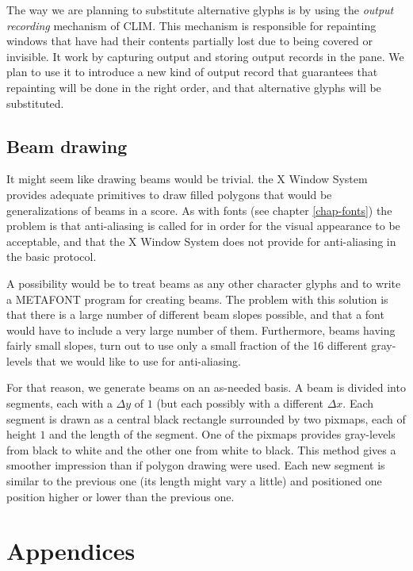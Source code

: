 \documentclass[11pt]{book}
\def\clim{CLIM}
\def\xwin{the X Window System}
\def\metafont{METAFONT}
\begin{document}
The way we are planning to substitute alternative glyphs is by using
the \emph{output recording} mechanism of {\clim}.  This mechanism is
responsible for repainting windows that have had their contents
partially lost due to being covered or invisible.  It work by
capturing output and storing output records in the pane.  We plan to
use it to introduce a new kind of output record that guarantees that
repainting  will be done in the right order, and that alternative
glyphs will be substituted. 

\chapter{Beam drawing}

It might seem like drawing beams would be trivial.  {\xwin} provides
adequate primitives to draw filled polygons that would be
generalizations of beams in a score.  As with fonts (see chapter
\ref{chap-fonts}) the problem is that anti-aliasing is called for in
order for the visual appearance to be acceptable, and that {\xwin}
does not provide for anti-aliasing in the basic protocol.  

A possibility would be to treat beams as any other character glyphs
and to write a {\metafont} program for creating beams.  The problem
with this solution is that there is a large number of different beam
slopes possible, and that a font would have to include a very large
number of them.  Furthermore, beams having fairly small slopes, turn
out to use only a small fraction of the 16 different gray-levels that
we would like to use for anti-aliasing. 

For that reason, we generate beams on an as-needed basis.  A beam is
divided into segments, each with a $\Delta y$ of $1$ (but each
possibly with a different $\Delta x$.  Each segment is drawn as a
central black rectangle surrounded by two pixmaps, each of height $1$
and the length of the segment.  One of the pixmaps provides
gray-levels from black to white and the other one from white to
black.  This method gives a smoother impression than if polygon
drawing were used.  Each new segment is similar to the previous one
(its length might vary a little) and positioned one position higher or
lower than the previous one.

\part{Appendices}
\appendix
\end{document}
